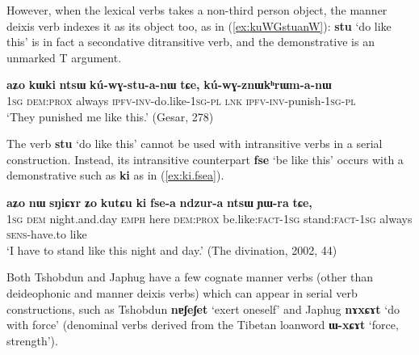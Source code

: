 \documentclass[oneside,a4paper,11pt]{article}
\newcommand{\ipa}[1]{\textbf{\phon#1}} %
\newcommand{\jpg}[2]{\ipa{#1} `#2'} %
\begin{document}
However, when the lexical verbs takes a non-third person object, the manner deixis verb indexes it as its object too, as in (\ref{ex:kuWGstuanW}): \jpg{stu}{do like this} is in fact a secondative ditransitive verb, and the demonstrative is an unmarked T argument.

\begin{exe}
\ex \label{ex:kuWGstuanW}
\gll 	
 \ipa{aʑo} 	\ipa{kɯki} 	\ipa{ntsɯ} 	\ipa{kú-wɣ-stu-a-nɯ} 	\ipa{tɕe,} 	\ipa{kú-wɣ-znɯkʰrɯm-a-nɯ} \\
 \textsc{1sg} \textsc{dem:prox} always \textsc{ipfv-inv}-do.like-\textsc{1sg-pl} \textsc{lnk} \textsc{ipfv-inv}-punish-\textsc{1sg-pl} \\
 \glt `They punished me like this.' (Gesar, 278)
\end{exe}	

The verb \jpg{stu}{do like this} cannot be used with intransitive verbs in a serial construction. Instead, its intransitive counterpart \jpg{fse}{be like this} occurs with a demonstrative such as \ipa{ki} as in (\ref{ex:ki.fsea}).

\begin{exe}
\ex \label{ex:ki.fsea}
\gll \ipa{aʑo} 	\ipa{nɯ} 	\ipa{sŋiɕɤr} 	\ipa{ʑo} 	\ipa{kutɕu} 	\ipa{ki} 	\ipa{fse-a} 	\ipa{ndzur-a} 	\ipa{ntsɯ} 	\ipa{ɲɯ-ra} 	\ipa{tɕe,} \\
\textsc{1sg} \textsc{dem} night.and.day \textsc{emph} here \textsc{dem:prox} be.like:\textsc{fact-1sg} stand:\textsc{fact-1sg} always \textsc{sens}-have.to like \\
\glt `I have to stand like this night and day.' (The divination, 2002, 44)
\end{exe}




Both Tshobdun and Japhug have a few cognate manner verbs (other than deideophonic and manner deixis verbs) which can appear in serial verb constructions, such as Tshobdun \jpg{nɐʃeʃet}{exert oneself} and Japhug  \jpg{nɤxɕɤt}{do with force}  (denominal verbs derived from the Tibetan loanword \jpg{ɯ-xɕɤt}{force, strength}).
\end{document}
